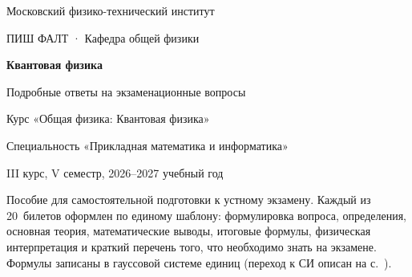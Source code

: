 \documentclass[11pt,a4paper,oneside,openany]{report}
\begin{document}
\begin{titlepage}
\sffamily
\vspace*{18mm}
\noindent{\color{accent}\rule{\linewidth}{1.2pt}}\par\vspace{8mm}
{\large Московский физико-технический институт\par
 ПИШ ФАЛТ · Кафедра общей физики\par}
\vspace{22mm}
{\Huge\bfseries\color{accent} Квантовая физика\par}
\vspace{6mm}
{\LARGE Подробные ответы на экзаменационные вопросы\par}
\vspace{10mm}
{\large Курс «Общая физика: Квантовая физика»\par
 Специальность «Прикладная математика и информатика»\par
 III курс, V семестр, 2026--2027 учебный год\par}
\vfill
\begin{tcolorbox}[enhanced, colback=accentlight, colframe=accent, boxrule=0pt,
  leftrule=3pt, arc=0pt, left=8pt, fontupper=\normalfont\small]
Пособие для самостоятельной подготовки к устному экзамену. Каждый из 20~билетов
оформлен по единому шаблону: формулировка вопроса, определения, основная теория,
математические выводы, итоговые формулы, физическая интерпретация и краткий
перечень того, что необходимо знать на экзамене. Формулы записаны в гауссовой
системе единиц (переход к СИ описан на с.~\pageref{sec:units}).
\end{tcolorbox}
\vspace{6mm}
\noindent{\color{accent}\rule{\linewidth}{1.2pt}}\par
\end{titlepage}

\setcounter{page}{2}
\tableofcontents
{}























\end{document}
